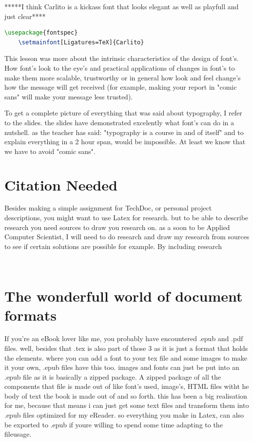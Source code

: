 \documentclass{article}
\begin{document}
\scriptsize{*****I think Carlito is a kickass font that looks elegant as well as playfull and just clear****}
\normalsize
\begin{lstlisting}[language=tex]
	\usepackage{fontspec}
	\setmainfont[Ligatures=TeX]{Carlito}
\end{lstlisting}

This lesson was more about the intrinsic characteristics of the design of font's. How font's look to the eye's and practical applications of changes in font's to make them more scalable, trustworthy or in general how look and feel change's how the message will get received (for example, making your report in "comic sans" will make your message less trusted).

To get a complete picture of everything that was said about typography, I refer to the slides. the slides have demonstrated excelently what font's can do in a nutshell. as the teacher has said: "typography is a course in and of itself" and to explain everything in a 2 hour span, would be impossible. At least we know that we have to avoid "comic sans".



\section{Citation Needed}
Besides making a simple assignment for TechDoc, or personal project descriptions, you might want to use Latex for research. but to be able to describe research you need sources to draw you research on. as a soon to be Applied Computer Scientist, I will need to do research and draw my research from sources to see if certain solutions are possible for example. By including research

~\cite{Nobody06}


\section{The wonderfull world of document formats}
If you're an eBook lover like me, you probably have encountered .epub and .pdf files. well, besides that .tex is also part of those 3 as it is just a format that holds the elements. where you can add a font to your tex file and some images to make it your own, .epub files have this too. images and fonts can just be put into an .epub file as it is basically a zipped package. A zipped package of all the components that file is made out of like font's used, image's, HTML files witht he body of text the book is made out of and so forth. this has been a big realisation for me, because that means i can just get some text files and transform them into .epub files optimized for my eReader. so everything you make in Latex, can also be exported to .epub if youre willing to spend some time adapting to the fileusage.
\end{document}

